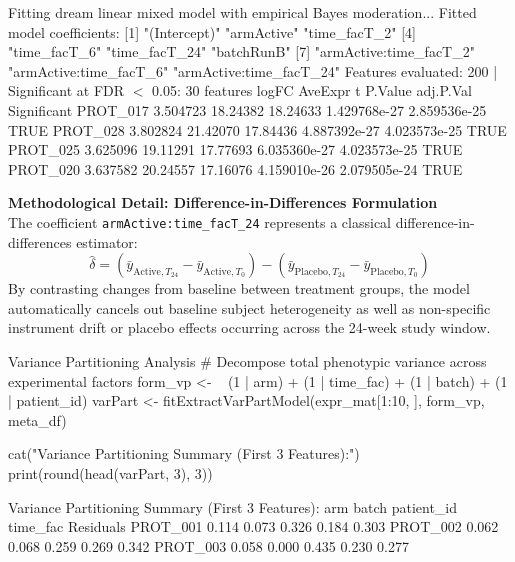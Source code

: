 \documentclass[11pt,twoside,openright]{book}
\begin{document}
\begin{routput}
Fitting dream linear mixed model with empirical Bayes moderation...
Fitted model coefficients:
{}[1] "(Intercept)"             "armActive"               "time\_facT\_2"           
{}[4] "time\_facT\_6"             "time\_facT\_24"            "batchRunB"             
{}[7] "armActive:time\_facT\_2"   "armActive:time\_facT\_6"   "armActive:time\_facT\_24"
Features evaluated: 200 | Significant at FDR $<$ 0.05: 30 features
            logFC  AveExpr        t      P.Value    adj.P.Val Significant
PROT\_017 3.504723 18.24382 18.24633 1.429768e-27 2.859536e-25        TRUE
PROT\_028 3.802824 21.42070 17.84436 4.887392e-27 4.023573e-25        TRUE
PROT\_025 3.625096 19.11291 17.77693 6.035360e-27 4.023573e-25        TRUE
PROT\_020 3.637582 20.24557 17.16076 4.159010e-26 2.079505e-24        TRUE
\end{routput}

\begin{notebox}
\textbf{Methodological Detail: Difference-in-Differences Formulation}\\
The coefficient \texttt{armActive:time\_facT\_24} represents a classical difference-in-differences estimator:
\begin{equation}
\label{eq:did_estimator}
\hat{\delta} = \left( \bar{y}_{\text{Active}, T_{24}} - \bar{y}_{\text{Active}, T_0} \right) - \left( \bar{y}_{\text{Placebo}, T_{24}} - \bar{y}_{\text{Placebo}, T_0} \right)
\end{equation}
By contrasting changes from baseline between treatment groups, the model automatically cancels out baseline subject heterogeneity as well as non-specific instrument drift or placebo effects occurring across the 24-week study window.
\end{notebox}

\begin{rchunk}{Variance Partitioning Analysis}
# Decompose total phenotypic variance across experimental factors
form_vp <- ~ (1 | arm) + (1 | time_fac) + (1 | batch) + (1 | patient_id)
varPart <- fitExtractVarPartModel(expr_mat[1:10, ], form_vp, meta_df)

cat("Variance Partitioning Summary (First 3 Features):\n")
print(round(head(varPart, 3), 3))
\end{rchunk}

\begin{routput}
Variance Partitioning Summary (First 3 Features):
           arm batch patient\_id time\_fac Residuals
PROT\_001 0.114 0.073      0.326    0.184     0.303
PROT\_002 0.062 0.068      0.259    0.269     0.342
PROT\_003 0.058 0.000      0.435    0.230     0.277
\end{routput}
\end{document}
